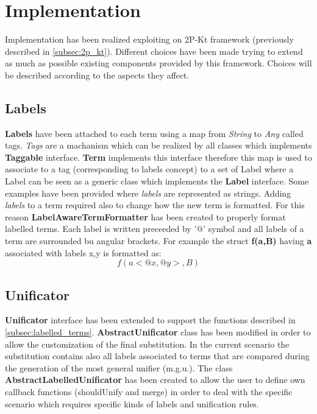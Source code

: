 \section{Implementation}\label{sec:implementation}

Implementation has been realized exploiting on 2P-Kt framework (previously described in \ref{subsec:2p_kt}).
Different choices have been made trying to extend as much as possible existing components provided by this framework.
Choices will be described according to the aspects they affect.

\subsection{Labels}\label{subsec:labels}

\textbf{Labels} have been attached to each term using a map from \textit{String} to \textit{Any} called tags. \textit{Tags}
are a machanism which can be realized by all classes which implements \textbf{Taggable} interface. \textbf{Term} implements
this interface therefore this map is used to associate to a tag (corresponding to labels concept) to a set of Label where a Label can be seen as a generic class
which implements the \textbf{Label} interface. Some examples have been provided where \textit{labels} are represented as strings.\newline
Adding \textit{labels} to a term required also to change how the new term is formatted. For this reason \textbf{LabelAwareTermFormatter} has been created
to properly format labelled terms. Each label is written preceeded by '@' symbol and all labels of a term are surrounded
bu angular brackets.\newline
For example the struct \textbf{f(a,B)} having \textbf{a} associated with labels {x,y} is formatted as:
\[f(a<@x,@y>,B)\]

\subsection{Unificator}\label{subsec:unificator}
\textbf{Unificator} interface has been extended to support the functions described in \ref{subsec:labelled_terms}.
\textbf{AbstractUnificator} class has been modified in order to allow the customization of the final substitution. In the current scenario
the substitution contains also all labels associated to terms that are compared during the generation of the most general unifier (m.g.u.).\newline
The class \textbf{AbstractLabelledUnificator} has been created to allow the user to define own callback functions (shouldUnify and merge) in order
to deal with the specific scenario which requires specific kinds of labels and unification rules.

